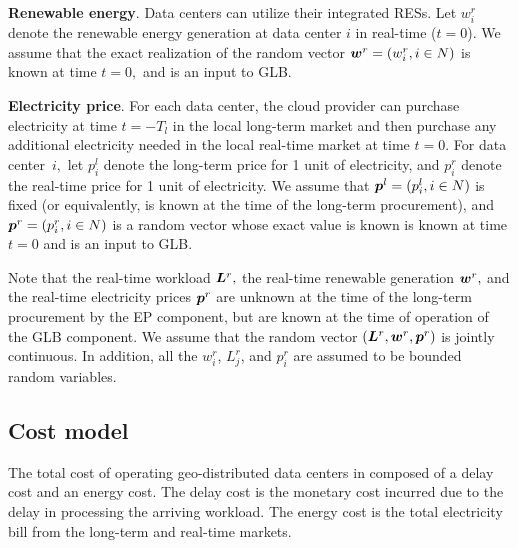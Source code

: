 \textbf{Renewable energy}. Data centers can utilize their integrated RESs. Let $w^r_i$ denote the renewable energy generation at data center $i$ in real-time ($t=0$). We assume that the exact realization of the random vector $\boldsymbol{w}^r = (w^r_i,i \in N)$ is known at time $t = 0,$ and is an input to GLB. 


\textbf{Electricity price}. For each data center, the cloud provider can purchase electricity at time $t=-T_l$ in the local long-term market and then purchase any additional electricity needed in the local real-time market at time $t = 0.$ For data center~$i,$ let $p^{l}_i$ denote the long-term price for 1 unit of electricity, and $p^{r}_i$ denote the real-time price for 1 unit of electricity. We assume that $\boldsymbol{p}^l = (p^l_i,i \in N)$ is fixed (or equivalently, is known at the time of the long-term procurement), and $\boldsymbol{p}^r= (p^r_i, i \in N)$ is a random vector whose exact value is known is known at time $t = 0$ and is an input to GLB.

Note that the real-time workload $\boldsymbol{L}^r,$ the real-time
renewable generation $\boldsymbol{w}^r,$ and the real-time electricity
prices $\boldsymbol{p}^r$ are unknown at the time of the long-term
procurement by the EP component, but are known at the time of
operation of the GLB component. We assume that the random vector
$(\boldsymbol{L}^r,\boldsymbol{w}^r,\boldsymbol{p}^r)$ is jointly continuous. In
addition, all the $w^r_i$, $L^r_j$, and $p^r_i$ are assumed to be
bounded random variables.


\subsection{Cost model}

The total cost of operating geo-distributed data centers in composed of a delay cost and an energy cost. The delay cost is the monetary cost incurred due to the delay in processing the arriving workload. The energy cost is the total electricity bill from the long-term and real-time markets.

